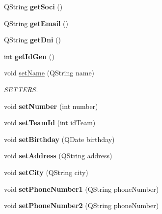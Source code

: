 \begin{DoxyCompactItemize}
Q\+String {\bfseries get\+Soci} ()
\item 
\mbox{\label{classjugador_a65a647a2c1beedbb2dc2e4b6847bff69}} 
Q\+String {\bfseries get\+Email} ()
\item 
\mbox{\label{classjugador_ac9609bf100bfb43e2e9582a8e69abdb5}} 
Q\+String {\bfseries get\+Dni} ()
\item 
\mbox{\label{classjugador_adb2f8c9bba1afa83be6ebf6a651769b2}} 
int {\bfseries get\+Id\+Gen} ()
\item 
\mbox{\label{classjugador_a0dcf58840f95ad87661987f7750c4355}} 
void \mbox{\hyperlink{classjugador_a0dcf58840f95ad87661987f7750c4355}{set\+Name}} (Q\+String name)
\begin{DoxyCompactList}\small\item\em S\+E\+T\+T\+E\+RS. \end{DoxyCompactList}\item 
\mbox{\label{classjugador_aa393b3dfb2eb1f269e66eb0b9e673973}} 
void {\bfseries set\+Number} (int number)
\item 
\mbox{\label{classjugador_ae853f109166a05c832bb89f84cc7408c}} 
void {\bfseries set\+Team\+Id} (int id\+Team)
\item 
\mbox{\label{classjugador_ac974fe74ff98272b5652de36e5ba4680}} 
void {\bfseries set\+Birthday} (Q\+Date birthday)
\item 
\mbox{\label{classjugador_a1e4da4c657e46c0368f1db72ce102d93}} 
void {\bfseries set\+Address} (Q\+String address)
\item 
\mbox{\label{classjugador_ae00869eb01324db252abe1b2df0032bc}} 
void {\bfseries set\+City} (Q\+String city)
\item 
\mbox{\label{classjugador_aaa04ccc1da6c45dea35b723a54e217d4}} 
void {\bfseries set\+Phone\+Number1} (Q\+String phone\+Number)
\item 
\mbox{\label{classjugador_a7541a8d0d7df4c5cc1fc49b15cd24da3}} 
void {\bfseries set\+Phone\+Number2} (Q\+String phone\+Number)

\end{DoxyCompactItemize}
